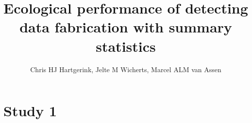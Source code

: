 \documentclass{article}
\title{Ecological performance of detecting data fabrication with summary statistics}
\author{Chris HJ Hartgerink, Jelte M Wicherts, Marcel ALM van Assen}
\begin{document}

\maketitle


\section*{Study 1}
\end{document}
